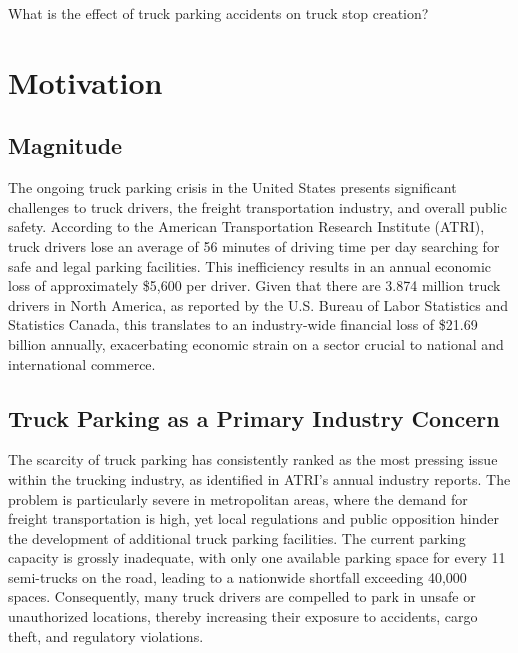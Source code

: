 \documentclass[
  12pt]{article}
\begin{document}
What is the effect of truck parking accidents on truck stop creation?

\hypertarget{motivation}{%
\section{Motivation}\label{motivation}}

\hypertarget{magnitude}{%
\subsection{Magnitude}\label{magnitude}}

The ongoing truck parking crisis in the United States presents
significant challenges to truck drivers, the freight transportation
industry, and overall public safety. According to the American
Transportation Research Institute (ATRI), truck drivers lose an average
of 56 minutes of driving time per day searching for safe and legal
parking facilities. This inefficiency results in an annual economic loss
of approximately \$5,600 per driver. Given that there are 3.874 million
truck drivers in North America, as reported by the U.S. Bureau of Labor
Statistics and Statistics Canada, this translates to an industry-wide
financial loss of \$21.69 billion annually, exacerbating economic strain
on a sector crucial to national and international commerce.

\hypertarget{truck-parking-as-a-primary-industry-concern}{%
\subsection{Truck Parking as a Primary Industry
Concern}\label{truck-parking-as-a-primary-industry-concern}}

The scarcity of truck parking has consistently ranked as the most
pressing issue within the trucking industry, as identified in ATRI's
annual industry reports. The problem is particularly severe in
metropolitan areas, where the demand for freight transportation is high,
yet local regulations and public opposition hinder the development of
additional truck parking facilities. The current parking capacity is
grossly inadequate, with only one available parking space for every 11
semi-trucks on the road, leading to a nationwide shortfall exceeding
40,000 spaces. Consequently, many truck drivers are compelled to park in
unsafe or unauthorized locations, thereby increasing their exposure to
accidents, cargo theft, and regulatory violations.
\end{document}
